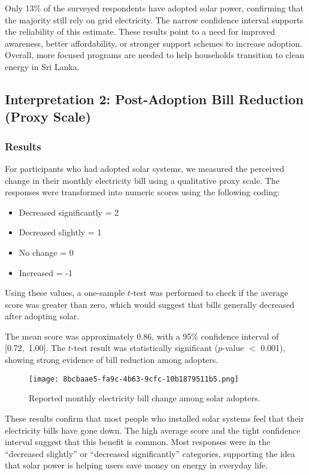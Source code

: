 \documentclass[12pt,a4paper]{article}
\begin{document}
Only 13\% of the surveyed respondents have adopted solar power, confirming that the majority still rely on grid electricity. The narrow confidence interval supports the reliability of this estimate. These results point to a need for improved awareness, better affordability, or stronger support schemes to increase adoption. Overall, more focused programs are needed to help households transition to clean energy in Sri Lanka.



\subsection{Interpretation 2: Post-Adoption Bill Reduction (Proxy Scale)}

\subsubsection*{Results}

For participants who had adopted solar systems, we measured the perceived change in their monthly electricity bill using a qualitative proxy scale. The responses were transformed into numeric scores using the following coding:

\begin{itemize}[noitemsep, topsep=0pt]
    \item Decreased significantly = 2
    \item Decreased slightly = 1
    \item No change = 0
    \item Increased = -1
\end{itemize}

Using these values, a one-sample $t$-test was performed to check if the average score was greater than zero, which would suggest that bills generally decreased after adopting solar.

The mean score was approximately 0.86, with a 95\% confidence interval of [0.72,\ 1.00]. The $t$-test result was statistically significant ($p$-value $<$ 0.001), showing strong evidence of bill reduction among adopters.

\begin{figure}[H]
  \centering
  \texttt{[image: 8bcbaae5-fa9c-4b63-9cfc-10b1879511b5.png]}
  \caption{Reported monthly electricity bill change among solar adopters.}
  \label{fig:bill-reduction}
\end{figure}

These results confirm that most people who installed solar systems feel that their electricity bills have gone down. The high average score and the tight confidence interval suggest that this benefit is common. Most responses were in the “decreased slightly” or “decreased significantly” categories, supporting the idea that solar power is helping users save money on energy in everyday life.
\end{document}
